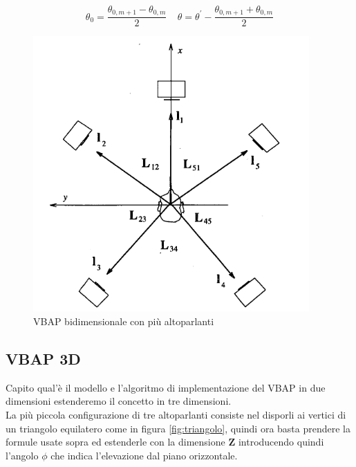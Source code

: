 \documentclass[12pt,a4paper]{report}
\begin{document}
\begin{equation}
\theta_0 = \dfrac{\theta_{0,m+1}-\theta_{0,m}}{2} \ \ \ \ \ \theta=\theta^{\prime}-\dfrac{\theta_{0,m+1}+\theta_{0,m}}{2}
\label{phidiverso}
\end{equation}

   
 \begin{figure}[htbp]
	\centering
	\includegraphics[scale=0.55]{figures/matrix5-1.png}
	\caption {VBAP bidimensionale con più altoparlanti} 
	\label{fig:angoli5}
	\end{figure}
  
   
   
\subsection{VBAP 3D}

Capito qual'è il modello e l'algoritmo di implementazione del VBAP in due dimensioni estenderemo il concetto in tre dimensioni.\\

La più piccola configurazione di tre altoparlanti consiste nel disporli ai vertici di un triangolo equilatero come in figura \ref{fig:triangolo}, quindi ora basta prendere la formule usate sopra ed estenderle con la dimensione $\boldsymbol{Z}$ introducendo quindi l'angolo $\phi$ che indica l'elevazione dal piano orizzontale.
\end{document}
